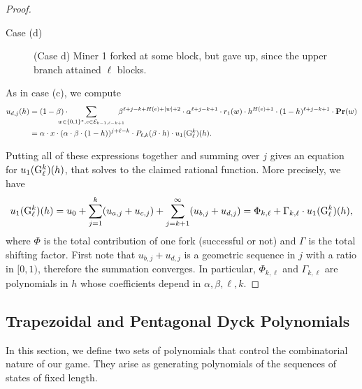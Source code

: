 \begin{proof}
\begin{subsubsection}{Case (d)}
\begin{figure}[ht!]
\caption{(Case d) Miner 1 forked at some block, but gave up, since the upper branch attained $\ell$ blocks.}
\end{figure}


As in case (c), we compute
\begin{align*}
u_{d,j}(h) &= (1-\beta) \cdot \!\!\!\!\!\!\!\!\!\sum_{w\in \bstring, e\in \Pent_{k-1, \ell-k+1}}\!\!\!\!\!\!\beta^{\ell+j-k+H(e)+|w|+2}\cdot \alpha^{\ell+j-k+1}\cdot r_1(w) \cdot h^{H(e)+1}\cdot(1-h)^{\ell+j-k+1}\cdot \pr(w)\\
        &= \alpha\cdot x\cdot(\alpha\cdot\beta\cdot(1-h))^{j+\ell-k}\cdot P_{\ell,k}(\beta\cdot h) \cdot u_1(\gup^k_\ell)(h).
\end{align*}



\end{subsubsection}

Putting all of these expressions together and summing over $j$ gives an equation for $u_1({\rm {G}}^k_\ell)(h)$, that solves to the claimed rational function. More precisely, we have
$$u_1({\rm {G}}^k_\ell)(h) = u_0 + \sum_{j=1}^k (u_{a,j} + u_{c,j}) + \sum_{j=k+1}^\infty (u_{b,j} + u_{d,j}) = \Phi_{k,\ell} + \Gamma_{k,\ell}\cdot u_1({\rm {G}}^k_\ell)(h),$$
where $\Phi$ is the total contribution of one fork (successful or not) and $\Gamma$ is the total shifting factor. First note that $u_{b,j}+u_{d,j}$ is a geometric sequence in $j$ with a ratio in $[0,1)$, therefore the summation converges. In particular, $\Phi_{k,\ell}$ and $\Gamma_{k,\ell}$ are polynomials in $h$ whose coefficients depend in $\alpha,\beta,\ell,k$.
\end{proof}

\subsection{Trapezoidal and Pentagonal Dyck Polynomials}
\label{sec-trapezoid-pentagon}

In this section, we define two sets of polynomials that control the combinatorial nature of our game. They arise as generating polynomials of the sequences of states of fixed length. 

